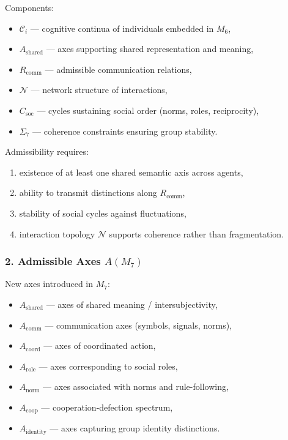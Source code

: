 Components:

\begin{itemize}
    \item $\mathcal{C}_i$ — cognitive continua of individuals embedded in $M_6$,
    \item $A_{\mathrm{shared}}$ — axes supporting shared representation and meaning,
    \item $R_{\mathrm{comm}}$ — admissible communication relations,
    \item $\mathcal{N}$ — network structure of interactions,
    \item $C_{\mathrm{soc}}$ — cycles sustaining social order (norms, roles, reciprocity),
    \item $\Sigma_7$ — coherence constraints ensuring group stability.
\end{itemize}

Admissibility requires:

\begin{enumerate}
    \item existence of at least one shared semantic axis across agents,
    \item ability to transmit distinctions along $R_{\mathrm{comm}}$,
    \item stability of social cycles against fluctuations,
    \item interaction topology $\mathcal{N}$ supports coherence rather than fragmentation.
\end{enumerate}

\subsubsection*{2. Admissible Axes \texorpdfstring{$A(M_7)$}{A(M_7)}}

New axes introduced in $M_7$:

\begin{itemize}
    \item $A_{\mathrm{shared}}$ — axes of shared meaning / intersubjectivity,
    \item $A_{\mathrm{comm}}$ — communication axes (symbols, signals, norms),
    \item $A_{\mathrm{coord}}$ — axes of coordinated action,
    \item $A_{\mathrm{role}}$ — axes corresponding to social roles,
    \item $A_{\mathrm{norm}}$ — axes associated with norms and rule-following,
    \item $A_{\mathrm{coop}}$ — cooperation-defection spectrum,
    \item $A_{\mathrm{identity}}$ — axes capturing group identity distinctions.
\end{itemize}

